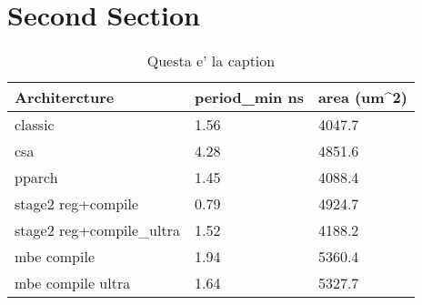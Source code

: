 \section{Second Section}


\begin{table}[h]
\begin{center}
\begin{tabular}{|l|l|l|}
\hline
Architercture & period_min ns & area (um^2)\\
\hline
classic & 1.56 & 4047.7\\
\hline
csa & 4.28 & 4851.6\\
\hline
pparch & 1.45 & 4088.4\\
\hline
stage2 reg+compile & 0.79 & 4924.7\\
\hline
stage2 reg+compile\_ultra & 1.52 & 4188.2\\
\hline
mbe compile & 1.94 & 5360.4\\
\hline
mbe compile ultra & 1.64 & 5327.7\\
\hline
\end{tabular}
\end{center}
\caption{Questa e' la caption}
\label{tab:tab_label}
\end{table}
